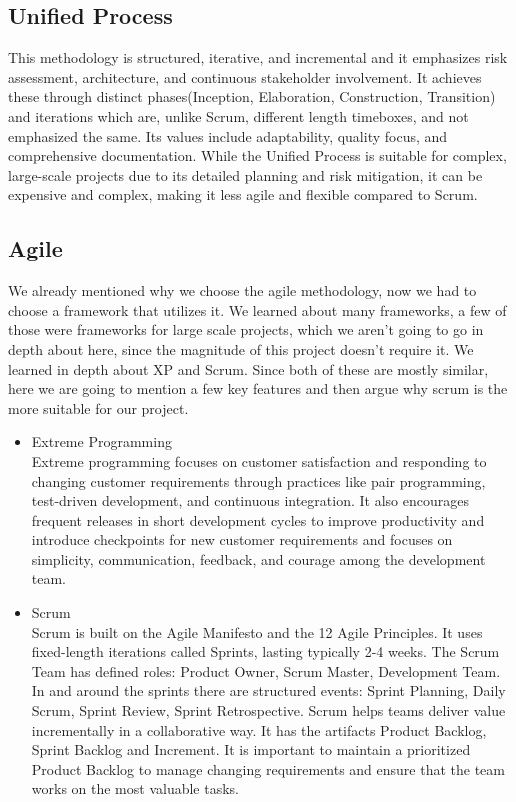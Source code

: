 \documentclass[12pt]{report}
\begin{document}
\subsection*{Unified Process}
This methodology is structured, iterative, and incremental and it emphasizes risk assessment, architecture, and continuous stakeholder involvement. It achieves these through distinct phases(Inception, Elaboration, Construction, Transition) and iterations which are, unlike Scrum, different length timeboxes, and not emphasized the same. Its values include adaptability, quality focus, and comprehensive documentation. While the Unified Process is suitable for complex, large-scale projects due to its detailed planning and risk mitigation, it can be expensive and complex, making it less agile and flexible compared to Scrum.

\subsection*{Agile}
We already mentioned why we choose the agile methodology, now we had to choose a framework that utilizes it. We learned about many frameworks, a few of those were frameworks for large scale projects, which we aren't going to go in depth about here, since the magnitude of this project doesn't require it. We learned in depth about XP and Scrum. Since both of these are mostly similar, here we are going to mention a few key features and then argue why scrum is the more suitable for our project.
\begin{itemize}
    \item Extreme Programming\\ Extreme programming focuses on customer satisfaction and responding to changing customer requirements through practices like pair programming, test-driven development, and continuous integration. It also encourages frequent releases in short development cycles to improve productivity and introduce checkpoints for new customer requirements and focuses on simplicity, communication, feedback, and courage among the development team.
    \item Scrum \\ Scrum is built on the Agile Manifesto and the 12 Agile Principles. It uses fixed-length iterations called Sprints, lasting typically 2-4 weeks. The Scrum Team has defined roles: Product Owner, Scrum Master, Development Team. In and around the sprints there are structured events: Sprint Planning, Daily Scrum, Sprint Review, Sprint Retrospective. Scrum helps teams deliver value incrementally in a collaborative way. It has the artifacts Product Backlog, Sprint Backlog and Increment. It is important to maintain a prioritized Product Backlog to manage changing requirements and ensure that the team works on the most valuable tasks.
\end{itemize}
\end{document}
